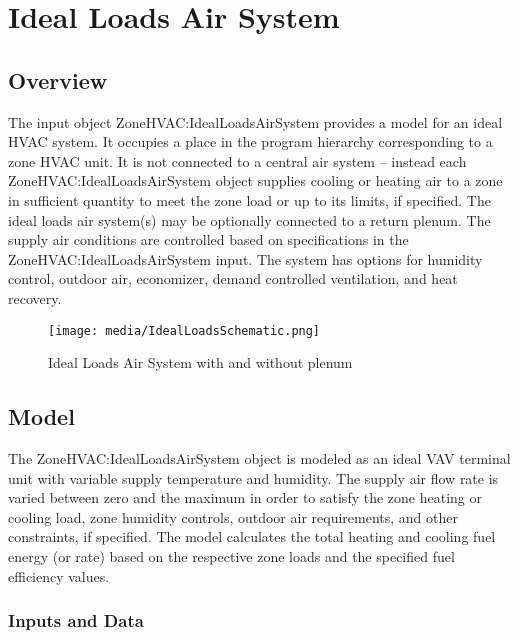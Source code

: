 \section{Ideal Loads Air System }\label{ideal-loads-air-system}

\subsection{Overview}\label{overview-021}

The input object ZoneHVAC:IdealLoadsAirSystem provides a model for an ideal HVAC system. It occupies a place in the program hierarchy corresponding to a zone HVAC unit. It is not connected to a central air system -- instead each ZoneHVAC:IdealLoadsAirSystem object supplies cooling or heating air to a zone in sufficient quantity to meet the zone load or up to its limits, if specified. The ideal loads air system(s) may be optionally connected to a return plenum. The supply air conditions are controlled based on specifications in the ZoneHVAC:IdealLoadsAirSystem input. The system has options for humidity control, outdoor air, economizer, demand controlled ventilation, and heat recovery.

\begin{figure}[hbtp] %
\centering
\texttt{[image: media/IdealLoadsSchematic.png]}
\caption{Ideal Loads Air System with and without plenum \protect \label{fig:ideal-loads-air-system-with-and-without-plenum}}
\end{figure}


\subsection{Model}\label{model-002}

The ZoneHVAC:IdealLoadsAirSystem object is modeled as an ideal VAV terminal unit with variable supply temperature and humidity. The supply air flow rate is varied between zero and the maximum in order to satisfy the zone heating or cooling load, zone humidity controls, outdoor air requirements, and other constraints, if specified. The model calculates the total heating and cooling fuel energy (or rate) based on the respective zone loads and the specified fuel efficiency values.

\subsubsection{Inputs and Data}\label{inputs-and-data-002}

